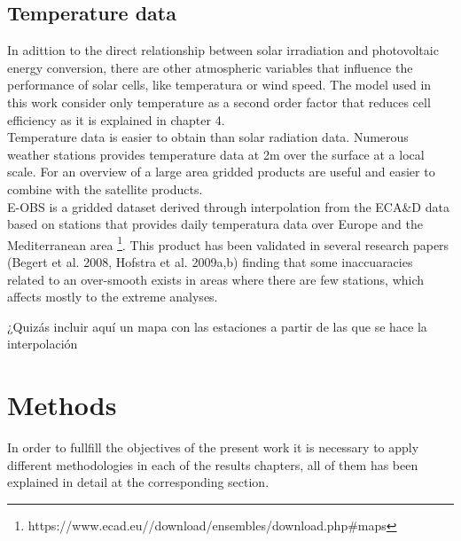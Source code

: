 \section{Temperature data}

  In adittion to the direct relationship between solar irradiation and photovoltaic energy conversion, there are other atmospheric variables that influence the performance of solar cells, like temperatura or wind speed. The model used in this work consider only temperature as a second order factor that reduces cell efficiency as it is explained in chapter 4.\\
 
  Temperature data is easier to obtain than solar radiation data. Numerous weather stations provides temperature data at 2m over the surface at a local scale. For an overview of a large area gridded products are useful and easier to combine with the satellite products.\\

  E-OBS is a gridded dataset derived through interpolation from the ECA\&D data based on stations that provides daily temperatura data over Europe and the Mediterranean area \footnote{https://www.ecad.eu//download/ensembles/download.php#maps}. This product has been validated in several research papers (Begert et al. 2008, Hofstra et al. 2009a,b) finding that some inaccuaracies related to an over-smooth exists in areas where there are few stations, which affects mostly to the extreme analyses.

{\color{red} ¿Quizás incluir aquí un mapa con las estaciones a partir de las que se hace la interpolación}  
\chapter{Methods\label{cha:methods}}

In order to fullfill the objectives of the present work it is necessary to apply different methodologies in each of the results chapters, all of them has been explained in detail at the corresponding section.\\ %

